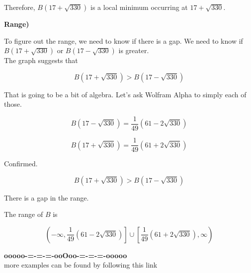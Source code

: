 \documentclass{ximera}
\begin{document}
\begin{example}
Therefore, $B(17 + \sqrt{330})$ is a local minimum occurring at $17 + \sqrt{330}$.









\textbf{Range)}


To figure out the range, we need to know if there is a gap.  We need to know if $B(17 + \sqrt{330})$ or $B(17 - \sqrt{330})$ is greater. \\

The graph suggests that 

\[
B(17 + \sqrt{330})  > B(17 - \sqrt{330})
\]


That is going to be a bit of algebra. Let's ask Wolfram Alpha to simply each of those.



\[
B(17 - \sqrt{330}) = \frac{1}{49} (61 - 2 \sqrt{330})
\]




\[
B(17 + \sqrt{330})  =  \frac{1}{49} (61 + 2 \sqrt{330})
\]


Confirmed.


\[
B(17 + \sqrt{330})  > B(17 - \sqrt{330})
\]


There is a gap in the range.


The range of $B$ is 


\[
\left( -\infty, \frac{1}{49} (61 - 2 \sqrt{330}) \right] \cup  \left[ \frac{1}{49} (61 + 2 \sqrt{330}), \infty \right) 
\]





\end{example}














\begin{center}
\textbf{\textcolor{green!50!black}{ooooo-=-=-=-ooOoo-=-=-=-ooooo}} \\

more examples can be found by following this link\\ 

\end{center}
\end{document}
